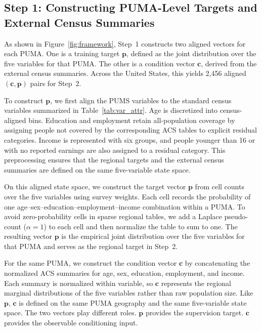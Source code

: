 \documentclass[11pt]{article}
\begin{document}
\subsection{Step 1: Constructing PUMA-Level Targets and External Census Summaries}
\label{sec:training_target}
As shown in Figure~\ref{fig:framework}, Step~1 constructs two aligned vectors for each PUMA. One is a training target $\mathbf{p}$, defined as the joint distribution over the five variables for that PUMA. The other is a condition vector $\mathbf{c}$, derived from the external census summaries. Across the United States, this yields 2,456 aligned $(\mathbf{c}, \mathbf{p})$ pairs for Step~2.

To construct $\mathbf{p}$, we first align the PUMS variables to the standard census variables summarized in Table~\ref{tab:var_attr}. Age is discretized into census-aligned bins. Education and employment retain all-population coverage by assigning people not covered by the corresponding ACS tables to explicit residual categories. Income is represented with six groups, and people younger than 16 or with no reported earnings are also assigned to a residual category. This preprocessing ensures that the regional targets and the external census summaries are defined on the same five-variable state space.

On this aligned state space, we construct the target vector $\mathbf{p}$ from cell counts over the five variables using survey weights. Each cell records the probability of one age--sex--education--employment--income combination within a PUMA. To avoid zero-probability cells in sparse regional tables, we add a Laplace pseudo-count ($\alpha=1$) to each cell and then normalize the table to sum to one. The resulting vector $\mathbf{p}$ is the empirical joint distribution over the five variables for that PUMA and serves as the regional target in Step~2.

For the same PUMA, we construct the condition vector $\mathbf{c}$ by concatenating the normalized ACS summaries for age, sex, education, employment, and income. Each summary is normalized within variable, so $\mathbf{c}$ represents the regional marginal distributions of the five variables rather than raw population size. Like $\mathbf{p}$, $\mathbf{c}$ is defined on the same PUMA geography and the same five-variable state space. The two vectors play different roles. $\mathbf{p}$ provides the supervision target. $\mathbf{c}$ provides the observable conditioning input.
\end{document}
